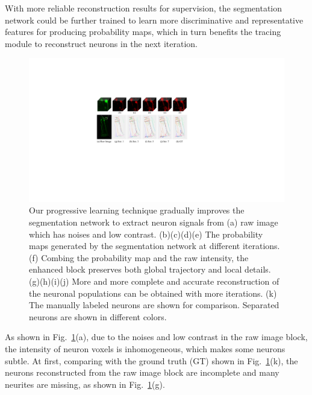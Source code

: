 With more reliable reconstruction results for supervision, the segmentation network could be further trained to learn more discriminative and representative features for producing probability maps, which in turn benefits the tracing module to reconstruct neurons in the next iteration.
\begin{figure}[t]
	\centering
	\includegraphics[width=1\columnwidth]{./Illustrations/ngps.pdf}
	\caption{
		Our progressive learning technique gradually improves the segmentation network to extract neuron signals from (a) raw image which has noises and low contrast. (b)(c)(d)(e) The probability maps generated by the segmentation network at different iterations. (f) Combing the probability map and the raw intensity, the enhanced block preserves both global trajectory and local details. (g)(h)(i)(j) More and more complete and accurate reconstruction of the neuronal populations can be obtained with more iterations. (k) The manually labeled neurons are shown for comparison. Separated neurons are shown in different colors.}
	\label{fig:ngps}
\end{figure}
%
As shown in Fig.~\ref{fig:ngps}(a), due to the noises and low contrast in the raw image block, the intensity of neuron voxels is inhomogeneous, which makes some neurons subtle.
At first, comparing with the ground truth (GT) shown in Fig.~\ref{fig:ngps}(k), the neurons reconstructed from the raw image block are incomplete and many neurites are missing, as shown in Fig.~\ref{fig:ngps}(g).
